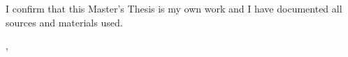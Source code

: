 \thispagestyle{empty}
\vspace*{0.7\textheight}

\noindent
I confirm that this Master's Thesis is my own work and I have documented all sources and materials used.

\vspace{35mm}
\noindent
\getSubmissionLocation{}, \getSubmissionDate{} \hspace{5cm} \getAuthor{}

\cleardoublepage{}
